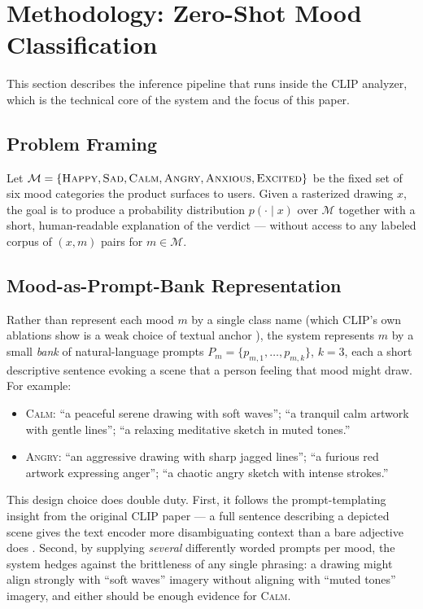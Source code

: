 \documentclass[10pt,twocolumn,letterpaper]{article}
\begin{document}
\section{Methodology: Zero-Shot Mood Classification}
\label{sec:methodology}

This section describes the inference pipeline that runs inside the CLIP analyzer, which is the technical core of the system and the focus of this paper.

\subsection{Problem Framing}

Let $\mathcal{M} = \{\textsc{Happy}, \textsc{Sad}, \textsc{Calm}, \textsc{Angry}, \textsc{Anxious}, \textsc{Excited}\}$ be the fixed set of six mood categories the product surfaces to users. Given a rasterized drawing $x$, the goal is to produce a probability distribution $p(\cdot \mid x)$ over $\mathcal{M}$ together with a short, human-readable explanation of the verdict --- without access to any labeled corpus of $(x, m)$ pairs for $m \in \mathcal{M}$.

\subsection{Mood-as-Prompt-Bank Representation}

Rather than represent each mood $m$ by a single class name (which CLIP's own ablations show is a weak choice of textual anchor \cite{radford2021clip}), the system represents $m$ by a small \emph{bank} of natural-language prompts $P_m = \{p_{m,1}, \ldots, p_{m,k}\}$, $k = 3$, each a short descriptive sentence evoking a scene that a person feeling that mood might draw. For example:
\begin{itemize}
    \item \textsc{Calm}: ``a peaceful serene drawing with soft waves''; ``a tranquil calm artwork with gentle lines''; ``a relaxing meditative sketch in muted tones.''
    \item \textsc{Angry}: ``an aggressive drawing with sharp jagged lines''; ``a furious red artwork expressing anger''; ``a chaotic angry sketch with intense strokes.''
\end{itemize}
This design choice does double duty. First, it follows the prompt-templating insight from the original CLIP paper --- a full sentence describing a depicted scene gives the text encoder more disambiguating context than a bare adjective does \cite{radford2021clip}. Second, by supplying \emph{several} differently worded prompts per mood, the system hedges against the brittleness of any single phrasing: a drawing might align strongly with ``soft waves'' imagery without aligning with ``muted tones'' imagery, and either should be enough evidence for \textsc{Calm}.
\end{document}
